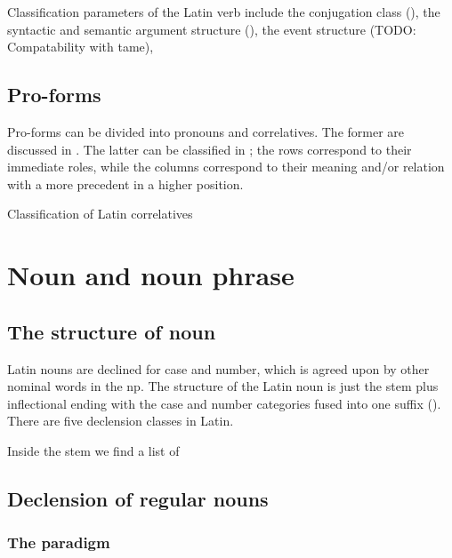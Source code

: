 \documentclass[a4paper, oneside]{report}
\begin{document}
Classification parameters of the Latin verb include 
the conjugation class (),
the syntactic and semantic argument structure
(), 
the event structure (TODO: Compatability with \acs{tame}),

\section{Pro-forms}

Pro-forms can be divided into pronouns and correlatives.
The former are discussed in .
The latter can be classified in ;
the rows correspond to their immediate roles,
while the columns correspond to their meaning and/or 
relation with a more precedent in a higher position.

\begin{sidewaystable}
    \centering
    \caption{Classification of Latin correlatives}
    \label{tbl:correlatives}
    
\end{sidewaystable}

\chapter{Noun and noun phrase}\label{chap:np}

\section{The structure of noun}\label{sec:np.noun}

Latin nouns are declined for case and number,
which is agreed upon by other nominal words in the \acs{np}.
The structure of the Latin noun is just
the stem plus inflectional ending 
with the case and number categories fused into one suffix
().
There are five declension classes in Latin.

Inside the stem we find a list of 

\section{Declension of regular nouns}\label{sec:regular-noun-declension}

\subsection{The paradigm}\label{sec:noun.paradigm.introduction}
\end{document}
